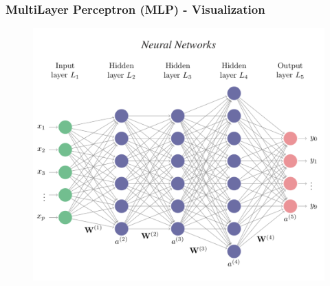 \documentclass{beamer}
\begin{document}
\begin{frame}
\begin{figure}
			\qquad
		\end{figure}
	\end{frame}

	\begin{frame}
		\frametitle{MultiLayer Perceptron (MLP) - Visualization}
		\begin{figure}
			\centering
			\includegraphics[scale=0.23]{images/mlp}
		\end{figure}
	\end{frame}
\end{document}
